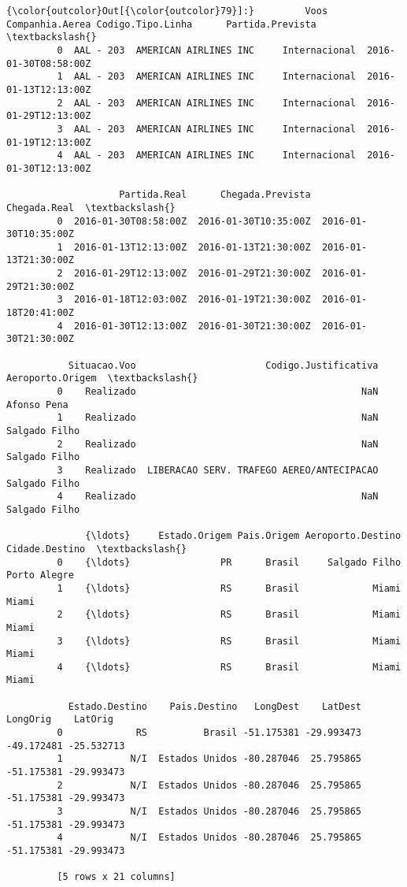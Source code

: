 \documentclass[11pt]{article}
\begin{document}
\begin{Verbatim}[commandchars=\\\{\}]
{\color{outcolor}Out[{\color{outcolor}79}]:}         Voos        Companhia.Aerea Codigo.Tipo.Linha      Partida.Prevista  \textbackslash{}
         0  AAL - 203  AMERICAN AIRLINES INC     Internacional  2016-01-30T08:58:00Z   
         1  AAL - 203  AMERICAN AIRLINES INC     Internacional  2016-01-13T12:13:00Z   
         2  AAL - 203  AMERICAN AIRLINES INC     Internacional  2016-01-29T12:13:00Z   
         3  AAL - 203  AMERICAN AIRLINES INC     Internacional  2016-01-19T12:13:00Z   
         4  AAL - 203  AMERICAN AIRLINES INC     Internacional  2016-01-30T12:13:00Z   
         
                    Partida.Real      Chegada.Prevista          Chegada.Real  \textbackslash{}
         0  2016-01-30T08:58:00Z  2016-01-30T10:35:00Z  2016-01-30T10:35:00Z   
         1  2016-01-13T12:13:00Z  2016-01-13T21:30:00Z  2016-01-13T21:30:00Z   
         2  2016-01-29T12:13:00Z  2016-01-29T21:30:00Z  2016-01-29T21:30:00Z   
         3  2016-01-18T12:03:00Z  2016-01-19T21:30:00Z  2016-01-18T20:41:00Z   
         4  2016-01-30T12:13:00Z  2016-01-30T21:30:00Z  2016-01-30T21:30:00Z   
         
           Situacao.Voo                       Codigo.Justificativa Aeroporto.Origem  \textbackslash{}
         0    Realizado                                        NaN      Afonso Pena   
         1    Realizado                                        NaN    Salgado Filho   
         2    Realizado                                        NaN    Salgado Filho   
         3    Realizado  LIBERACAO SERV. TRAFEGO AEREO/ANTECIPACAO    Salgado Filho   
         4    Realizado                                        NaN    Salgado Filho   
         
              {\ldots}     Estado.Origem Pais.Origem Aeroporto.Destino Cidade.Destino  \textbackslash{}
         0    {\ldots}                PR      Brasil     Salgado Filho   Porto Alegre   
         1    {\ldots}                RS      Brasil             Miami          Miami   
         2    {\ldots}                RS      Brasil             Miami          Miami   
         3    {\ldots}                RS      Brasil             Miami          Miami   
         4    {\ldots}                RS      Brasil             Miami          Miami   
         
           Estado.Destino    Pais.Destino   LongDest    LatDest   LongOrig    LatOrig  
         0             RS          Brasil -51.175381 -29.993473 -49.172481 -25.532713  
         1            N/I  Estados Unidos -80.287046  25.795865 -51.175381 -29.993473  
         2            N/I  Estados Unidos -80.287046  25.795865 -51.175381 -29.993473  
         3            N/I  Estados Unidos -80.287046  25.795865 -51.175381 -29.993473  
         4            N/I  Estados Unidos -80.287046  25.795865 -51.175381 -29.993473  
         
         [5 rows x 21 columns]
\end{Verbatim}
            
\end{document}
